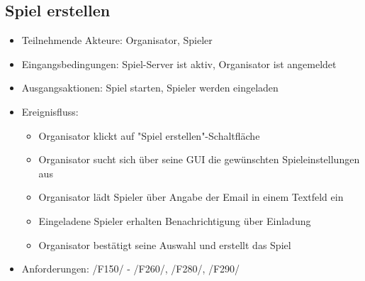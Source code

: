 \documentclass[a4paper]{scrreprt}
\begin{document}

    \subsection{Spiel erstellen}
    \begin{itemize}
        \item Teilnehmende Akteure: \Gls{Organisator}, \Gls{Spieler}
        \item Eingangsbedingungen: \Gls{Spiel-Server} ist aktiv, \Gls{Organisator} ist angemeldet
        \item Ausgangsaktionen: \Gls{Spiel} starten, \Gls{Spieler} werden eingeladen
        \item Ereignisfluss:
        \begin{itemize}
            \item \Gls{Organisator} klickt auf "Spiel erstellen"-Schaltfläche
            \item \Gls{Organisator} sucht sich über seine GUI die gewünschten \Gls{Spieleinstellungen} aus
            \item \Gls{Organisator} lädt \Gls{Spieler} über Angabe der Email in einem Textfeld ein
            \item Eingeladene \Gls{Spieler} erhalten Benachrichtigung über Einladung
            \item \Gls{Organisator} bestätigt seine Auswahl und erstellt das Spiel
        \end{itemize}
        \item Anforderungen: /F150/ - /F260/, /F280/, /F290/
    \end{itemize}
\end{document}
